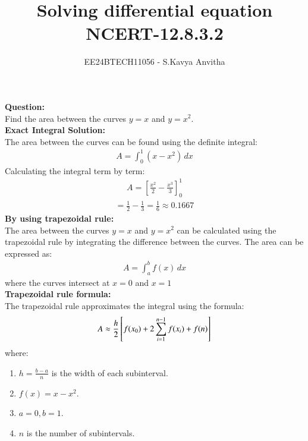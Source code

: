 \documentclass[journal]{IEEEtran}
\begin{document}

\vspace{3cm}

\title{Solving differential equation\\NCERT-12.8.3.2}
\author{EE24BTECH11056 - S.Kavya Anvitha}
\maketitle
\bigskip

\renewcommand{\thefigure}{\theenumi}
\renewcommand{\thetable}{\theenumi}
\textbf{Question:}\\
Find the area between the curves $y = x$ and $y = x^2$.\\
\textbf{Exact Integral Solution:}\\
The area between the curves can be found using the definite integral:
\begin{align}
    A = \int_{0}^{1} (x - x^2) \, dx
\end{align}
 Calculating the integral term by term:
\begin{align}
    A = \left[ \frac{x^2}{2} - \frac{x^3}{3} \right]_0^1
\end{align}
\begin{align}
    = \frac{1}{2} - \frac{1}{3} = \frac{1}{6} \approx 0.1667
\end{align}
\textbf{By using trapezoidal rule:}\\
The area between the curves 
$y=x$ and $y=x^2$ can be calculated using the trapezoidal rule by integrating the difference between the curves. The area can be expressed as:
\begin{align}
    A = \int_{a}^{b} f(x) \, dx
\end{align}
where the curves intersect at $x=0$ and $x=1$\\
\textbf{Trapezoidal rule formula:}\\
The trapezoidal rule approximates the integral using the formula:\\
\begin{align}
    A \approx \frac{h}{2}{}\left[f(x_0)+2\sum_{i=1}^{n-1} f(x_i) + f(n)\right]
\end{align}
where:\\
\begin{enumerate}
   \item $h=\frac{b-a}{n}$ is the width of each subinterval.
   \item $f(x) = x-x^2$.
   \item $a=0,b=1$.
   \item $n$ is the number of subintervals.
\end{enumerate}
\end{document}

